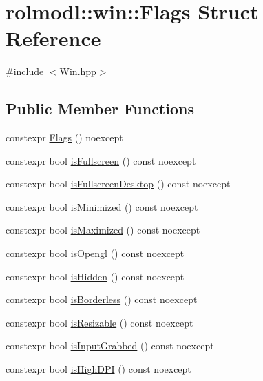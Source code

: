 \hypertarget{structrolmodl_1_1win_1_1_flags}{}\section{rolmodl\+::win\+::Flags Struct Reference}
\label{structrolmodl_1_1win_1_1_flags}


{\ttfamily \#include $<$Win.\+hpp$>$}

\subsection*{Public Member Functions}
\begin{DoxyCompactItemize}
\item 
constexpr \mbox{\hyperlink{structrolmodl_1_1win_1_1_flags_a17bba92f2587d1c78ec24db4660c13c2}{Flags}} () noexcept
\item 
constexpr bool \mbox{\hyperlink{structrolmodl_1_1win_1_1_flags_a84748982773d30642d956746289d9d9e}{is\+Fullscreen}} () const noexcept
\item 
constexpr bool \mbox{\hyperlink{structrolmodl_1_1win_1_1_flags_a583810151b94e30166cd476de7c5574a}{is\+Fullscreen\+Desktop}} () const noexcept
\item 
constexpr bool \mbox{\hyperlink{structrolmodl_1_1win_1_1_flags_a07a1f5140f642a20af1d591bdd8fbde6}{is\+Minimized}} () const noexcept
\item 
constexpr bool \mbox{\hyperlink{structrolmodl_1_1win_1_1_flags_adc44df6fb0405dbc6b1607c74c308176}{is\+Maximized}} () const noexcept
\item 
constexpr bool \mbox{\hyperlink{structrolmodl_1_1win_1_1_flags_a58ad4049cd9baf3340cab0d84d1397a9}{is\+Opengl}} () const noexcept
\item 
constexpr bool \mbox{\hyperlink{structrolmodl_1_1win_1_1_flags_a2a8ab288e5dcebcbf4d224236b4820db}{is\+Hidden}} () const noexcept
\item 
constexpr bool \mbox{\hyperlink{structrolmodl_1_1win_1_1_flags_a2d0ae92e299bbd6245c714f774de7632}{is\+Borderless}} () const noexcept
\item 
constexpr bool \mbox{\hyperlink{structrolmodl_1_1win_1_1_flags_a84d7a900fc3170f2605d7d49c2e5e79e}{is\+Resizable}} () const noexcept
\item 
constexpr bool \mbox{\hyperlink{structrolmodl_1_1win_1_1_flags_a877f7e2a27418e74c2123e192cc3c8e9}{is\+Input\+Grabbed}} () const noexcept
\item 
constexpr bool \mbox{\hyperlink{structrolmodl_1_1win_1_1_flags_a11e8e848df5120fb07b1088b53103021}{is\+High\+D\+PI}} () const noexcept

\end{DoxyCompactItemize}
